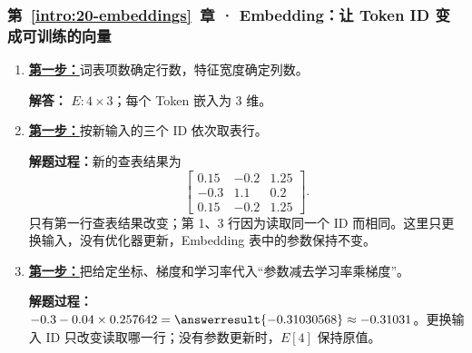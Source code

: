 \subsubsection*{第~\ref*{intro:20-embeddings}~章 · Embedding：让 Token ID 变成可训练的向量}
\begin{enumerate}[label={},leftmargin=4.8em,itemsep=4pt]
\item[\textbf{C-047.}] \leavevmode{}\label{solution:C-047}\label{solution:embedding-shape}\hyperref[exercise:embedding-shape]{\textbf{第一步：}}词表项数确定行数，特征宽度确定列数。\par\nobreak
\textbf{解答：} $E:4\times3$；每个 Token 嵌入为 3 维。
\item[\textbf{C-048.}] \leavevmode{}\label{solution:C-048}\label{solution:embedding-input-change}\hyperref[exercise:embedding-input-change]{\textbf{第一步：}}按新输入的三个 ID 依次取表行。\par\nobreak
\textbf{解题过程：}新的查表结果为
\[\begin{bmatrix}0.15&-0.2&1.25\\-0.3&1.1&0.2\\0.15&-0.2&1.25\end{bmatrix}.\]
只有第一行查表结果改变；第 1、3 行因为读取同一个 ID 而相同。这里只更换输入，没有优化器更新，Embedding 表中的参数保持不变。
\item[\textbf{C-049.}] \leavevmode{}\label{solution:C-049}\label{solution:embedding-update}\hyperref[exercise:embedding-update]{\textbf{第一步：}}把给定坐标、梯度和学习率代入“参数减去学习率乘梯度”。\par\nobreak
\textbf{解题过程：}$-0.3-0.04\times0.257642=\answerresult{-0.31030568}\approx-0.31031$。更换输入 ID 只改变读取哪一行；没有参数更新时，$E[4]$ 保持原值。
\end{enumerate}
